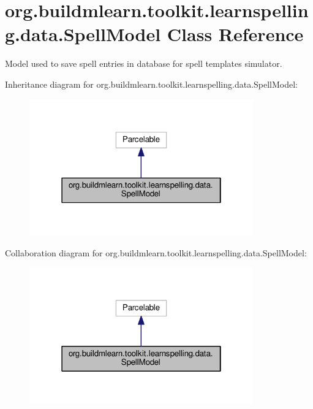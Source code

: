 \hypertarget{classorg_1_1buildmlearn_1_1toolkit_1_1learnspelling_1_1data_1_1SpellModel}{}\section{org.\+buildmlearn.\+toolkit.\+learnspelling.\+data.\+Spell\+Model Class Reference}
\label{classorg_1_1buildmlearn_1_1toolkit_1_1learnspelling_1_1data_1_1SpellModel}


Model used to save spell entries in database for spell template\textquotesingle{}s simulator.  




Inheritance diagram for org.\+buildmlearn.\+toolkit.\+learnspelling.\+data.\+Spell\+Model\+:
\nopagebreak
\begin{figure}[H]
\begin{center}
\leavevmode
\includegraphics[width=274pt]{classorg_1_1buildmlearn_1_1toolkit_1_1learnspelling_1_1data_1_1SpellModel__inherit__graph}
\end{center}
\end{figure}


Collaboration diagram for org.\+buildmlearn.\+toolkit.\+learnspelling.\+data.\+Spell\+Model\+:
\nopagebreak
\begin{figure}[H]
\begin{center}
\leavevmode
\includegraphics[width=274pt]{classorg_1_1buildmlearn_1_1toolkit_1_1learnspelling_1_1data_1_1SpellModel__coll__graph}
\end{center}
\end{figure}
